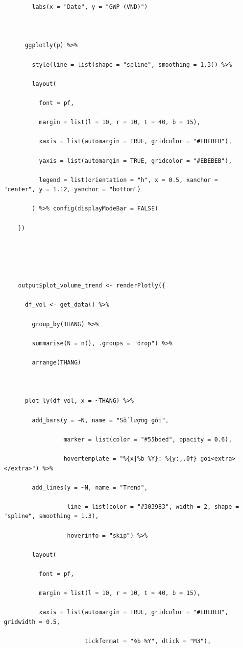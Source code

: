 \documentclass[12pt, a4paper]{article}
\begin{document}
\begin{lstlisting}
        labs(x = "Date", y = "GWP (VND)")



      ggplotly(p) %>%

        style(line = list(shape = "spline", smoothing = 1.3)) %>%

        layout(

          font = pf,

          margin = list(l = 10, r = 10, t = 40, b = 15),

          xaxis = list(automargin = TRUE, gridcolor = "#EBEBEB"),

          yaxis = list(automargin = TRUE, gridcolor = "#EBEBEB"),

          legend = list(orientation = "h", x = 0.5, xanchor = "center", y = 1.12, yanchor = "bottom")

        ) %>% config(displayModeBar = FALSE)

    })





    output$plot_volume_trend <- renderPlotly({

      df_vol <- get_data() %>%

        group_by(THANG) %>%

        summarise(N = n(), .groups = "drop") %>%

        arrange(THANG)



      plot_ly(df_vol, x = ~THANG) %>%

        add_bars(y = ~N, name = "Số lượng gói",

                 marker = list(color = "#55bded", opacity = 0.6),

                 hovertemplate = "%{x|%b %Y}: %{y:,.0f} goi<extra></extra>") %>%

        add_lines(y = ~N, name = "Trend",

                  line = list(color = "#303983", width = 2, shape = "spline", smoothing = 1.3),

                  hoverinfo = "skip") %>%

        layout(

          font = pf,

          margin = list(l = 10, r = 10, t = 40, b = 15),

          xaxis = list(automargin = TRUE, gridcolor = "#EBEBEB", gridwidth = 0.5,

                       tickformat = "%b %Y", dtick = "M3"),


\end{lstlisting}
\end{document}
